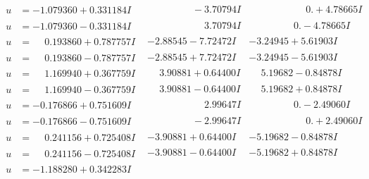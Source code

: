 \documentclass[1p]{elsarticle_modified}
\theoremstyle{definition}
\begin{document}
$$\begin{array}{c|c|c}
\begin{aligned}
u &= -1.079360 + 0.331184 I\end{aligned}
 & \phantom{-0.000000 } -3.70794 I & \phantom{-0.000000 -}0. + 4.78665 I \\ \hline\begin{aligned}
u &= -1.079360 - 0.331184 I\end{aligned}
 & \phantom{-0.000000 -}3.70794 I & \phantom{-0.000000 } 0. - 4.78665 I \\ \hline\begin{aligned}
u &= \phantom{-}0.193860 + 0.787757 I\end{aligned}
 & -2.88545 - 7.72472 I & -3.24945 + 5.61903 I \\ \hline\begin{aligned}
u &= \phantom{-}0.193860 - 0.787757 I\end{aligned}
 & -2.88545 + 7.72472 I & -3.24945 - 5.61903 I \\ \hline\begin{aligned}
u &= \phantom{-}1.169940 + 0.367759 I\end{aligned}
 & \phantom{-}3.90881 + 0.64400 I & \phantom{-}5.19682 - 0.84878 I \\ \hline\begin{aligned}
u &= \phantom{-}1.169940 - 0.367759 I\end{aligned}
 & \phantom{-}3.90881 - 0.64400 I & \phantom{-}5.19682 + 0.84878 I \\ \hline\begin{aligned}
u &= -0.176866 + 0.751609 I\end{aligned}
 & \phantom{-0.000000 -}2.99647 I & \phantom{-0.000000 } 0. - 2.49060 I \\ \hline\begin{aligned}
u &= -0.176866 - 0.751609 I\end{aligned}
 & \phantom{-0.000000 } -2.99647 I & \phantom{-0.000000 -}0. + 2.49060 I \\ \hline\begin{aligned}
u &= \phantom{-}0.241156 + 0.725408 I\end{aligned}
 & -3.90881 + 0.64400 I & -5.19682 - 0.84878 I \\ \hline\begin{aligned}
u &= \phantom{-}0.241156 - 0.725408 I\end{aligned}
 & -3.90881 - 0.64400 I & -5.19682 + 0.84878 I \\ \hline\begin{aligned}
u &= -1.188280 + 0.342283 I\end{aligned}

\end{array}$$
\end{document}
